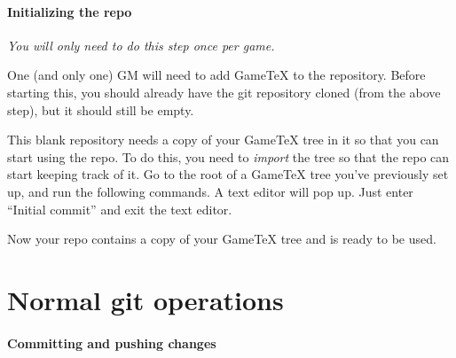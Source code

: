 \documentclass[green]{testgame}
\begin{document}
\paragraph*{Initializing the repo} \emph{You will only need to do this step once per game.}

One (and only one) GM will need to add GameTeX to the repository. Before starting this, you should already have the git repository cloned (from the above step), but it should still be empty.


This blank repository needs a copy of your GameTeX tree in it so that
you can start using the repo. To do this, you need to \emph{import} the
tree so that the repo can start keeping track of it. Go to the root of
a GameTeX tree you've previously set up, and run the following
commands. A text editor will pop up. Just enter ``Initial commit'' and
exit the text editor.


Now your repo contains a copy of your GameTeX tree and is ready to be
used.

\section{Normal git operations}
\label{sec:normal}

\paragraph*{Committing and pushing changes}


\end{document}
